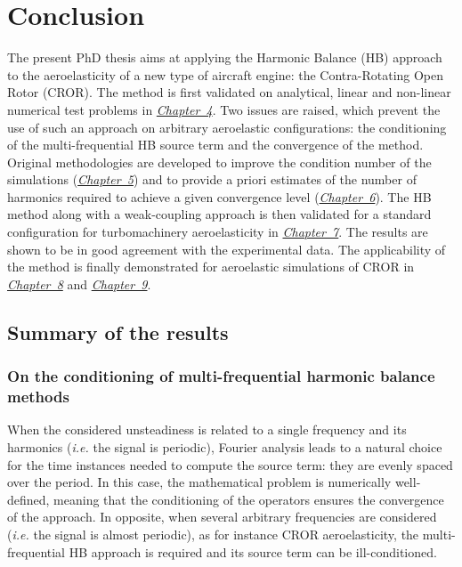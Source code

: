 
\chapter*{Conclusion}

The present PhD thesis aims at applying the Harmonic Balance (HB) approach to the 
aeroelasticity of a new type of aircraft engine: 
the Contra-Rotating Open Rotor (CROR). The method is 
first validated on analytical, linear and non-linear 
numerical test problems in \hyperref[cha:validation_hb]{\emph{Chapter~4}}. 
Two issues are raised, which prevent the use of such an approach 
on arbitrary aeroelastic configurations: the conditioning of
the multi-frequential HB source term and the
convergence of the method. Original methodologies are developed 
to improve the condition number of the simulations 
(\hyperref[cha:limitations_condition_number]{\emph{Chapter~5}})
and to provide a priori estimates of the number of harmonics 
required to achieve a given convergence level
(\hyperref[cha:limitations_convergence]{\emph{Chapter~6}}). 
The HB method along with a weak-coupling approach
is then validated for a standard configuration 
for turbomachinery aeroelasticity in \hyperref[cha:stcf11]{\emph{Chapter~7}}. 
The results are shown to be in good agreement 
with the experimental data. The applicability of the method 
is finally demonstrated for aeroelastic 
simulations of CROR
in \hyperref[cha:dream_ls_isolated]{\emph{Chapter~8}}
and \hyperref[cha:dream_hs_isolated]{\emph{Chapter~9}}.

\section*{Summary of the results}

\subsection*{On the conditioning of multi-frequential harmonic balance methods}

When the considered unsteadiness is related to a single frequency and its
harmonics (\emph{i.e.} the signal is periodic), 
Fourier analysis leads to a natural choice for the time instances
needed to compute the source term:
they are evenly spaced over the period. In this case, the mathematical
problem is numerically well-defined, meaning that the conditioning of
the operators ensures the convergence of the approach.
In opposite, when several arbitrary frequencies are 
considered (\emph{i.e.} the signal is almost periodic), as for instance CROR
aeroelasticity, the multi-frequential HB approach
is required and its source term can be ill-conditioned.

